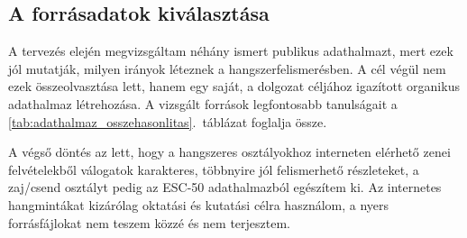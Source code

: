 \subsection{A forrásadatok kiválasztása}
\label{subsec:own_dataset}

A tervezés elején megvizsgáltam néhány ismert publikus adathalmazt, mert ezek jól mutatják, milyen irányok léteznek a hangszerfelismerésben. A cél végül nem ezek összeolvasztása lett, hanem egy saját, a dolgozat céljához igazított organikus adathalmaz létrehozása. A vizsgált források legfontosabb tanulságait a \ref{tab:adathalmaz_osszehasonlitas}.~táblázat foglalja össze.

\begin{table}[H]
\centering
\caption{A vizsgált publikus adathalmazok tervezési szempontú összefoglalása}
\label{tab:adathalmaz_osszehasonlitas}
\end{table}

A végső döntés az lett, hogy a hangszeres osztályokhoz interneten elérhető zenei felvételekből válogatok karakteres, többnyire jól felismerhető részleteket, a zaj/csend osztályt pedig az ESC-50 adathalmazból egészítem ki. Az internetes hangmintákat kizárólag oktatási és kutatási célra használom, a nyers forrásfájlokat nem teszem közzé és nem terjesztem.

